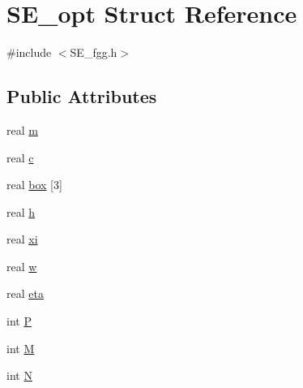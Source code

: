 \hypertarget{structSE__opt}{\section{\-S\-E\-\_\-opt \-Struct \-Reference}
\label{structSE__opt}
}


{\ttfamily \#include $<$\-S\-E\-\_\-fgg.\-h$>$}

\subsection*{\-Public \-Attributes}
\begin{DoxyCompactItemize}
\item 
real \hyperlink{structSE__opt_af15d0da7ed6b4c7505a917538545fe19}{m}
\item 
real \hyperlink{structSE__opt_aa8df042d2bbed10a996da67e098d2f00}{c}
\item 
real \hyperlink{structSE__opt_ab90d21148b629a403739afb5c6ccd980}{box} \mbox{[}3\mbox{]}
\item 
real \hyperlink{structSE__opt_ae2e1880825b1f20403030c2b8f43a89e}{h}
\item 
real \hyperlink{structSE__opt_aa1790562e9882a0e41122a800190c175}{xi}
\item 
real \hyperlink{structSE__opt_a00118fc9290ca016043a73d6aa72a25a}{w}
\item 
real \hyperlink{structSE__opt_a028a96f30b3050e2dfa438a63e6a2a39}{eta}
\item 
int \hyperlink{structSE__opt_a1128eea0601dff3a1564c9ce21b09c68}{\-P}
\item 
int \hyperlink{structSE__opt_a0fd608f41f29b58e8f7f597ce9644a07}{\-M}
\item 
int \hyperlink{structSE__opt_a4ae1f1321d14e510c19457ae9fc5880c}{\-N}
\end{DoxyCompactItemize}



